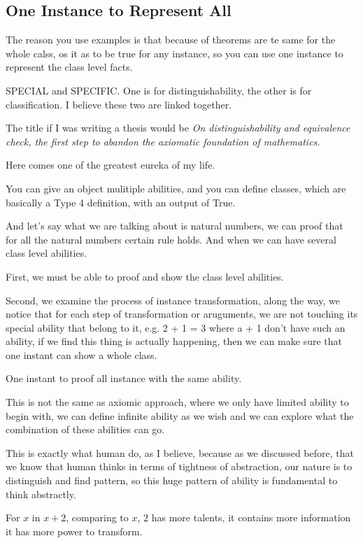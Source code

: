 \subsection{One Instance to Represent All}

The reason you use examples is that because of theorems are te same for the whole calss, os it as to be true for any instance, so you can use one instance to represent the class level facts.

SPECIAL and SPECIFIC. One is for distinguishability, the other is for classification. I believe these two are linked together.

The title if I was writing a thesis would be \textit{On distinguishability and equivalence check, the first step to abandon the axiomatic foundation of mathematics.}


Here comes one of the greatest eureka of my life.

You can give an object mulitiple abilities, and you can define classes, which are basically a Type 4 definition, with an output of True.

And let's say what we are talking about is natural numbers, we can proof that for all the natural numbers certain rule holds. And when we can have several class level abilities.

First, we must be able to proof and show the class level abilities.

Second, we examine the process of instance transformation, along the way, we notice that for each step of transformation or aruguments, we are not touching its special ability that belong to it, e.g. 2 + 1 = 3 where a + 1 don't have such an ability, if we find this thing is actually happening, then we can make sure that one instant can show a whole class.

One instant to proof all instance with the same ability.

This is not the same as axiomic approach, where we only have limited ability to begin with, we can define infinite ability as we wish and we can explore what the combination of these abilities can go.

This is exactly what human do, as I believe, because as we discussed before, that we know that human thinks in terms of tightness of abstraction, our nature is to distinguish and find pattern, so this huge pattern of ability is fundamental to think abstractly.

For $x$ in $x + 2$, comparing to $x$, $2$ has more talents, it contains more information it has more power to transform.


